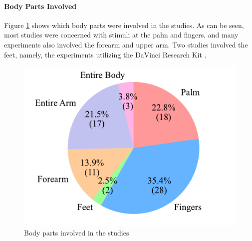 \paragraph{Body Parts Involved}

Figure \ref{fig:body_parts_pie} shows which body parts were involved in the studies. As can be seen, most studies were concerned with stimuli at the palm and fingers, and many experiments also involved the forearm and upper arm. Two studies involved the feet, namely, the experiments utilizing the DaVinci Research Kit \cite{Caccianiga2021, Oquendo2024}.

\begin{figure}[htbp]
    \centering
    \includegraphics[width=0.8\columnwidth]{figures/body_pie.pdf} 
    \caption{Body parts involved in the studies}
    \label{fig:body_parts_pie}
\end{figure} 

